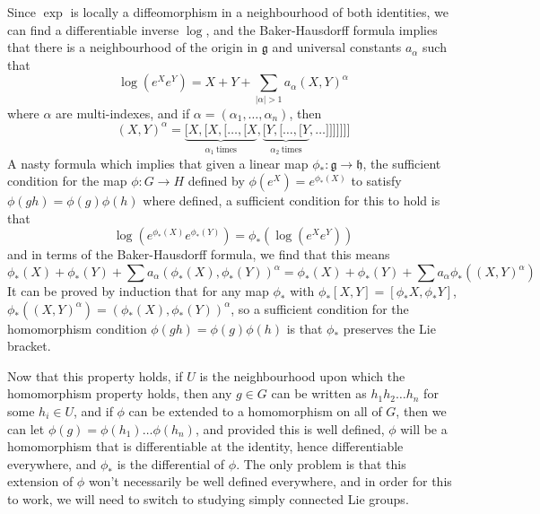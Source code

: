 Since $\exp$ is locally a diffeomorphism in a neighbourhood of both identities, we can find a differentiable inverse $\log$, and the Baker-Hausdorff formula implies that there is a neighbourhood of the origin in $\mathfrak{g}$ and universal constants $a_\alpha$ such that
%
\[ \log(e^X e^Y) = X + Y + \sum_{|\alpha| > 1} a_\alpha (X,Y)^\alpha \]
%
where $\alpha$ are multi-indexes, and if $\alpha = (\alpha_1, \dots, \alpha_n)$, then
%
\[ (X,Y)^\alpha = \underbrace{[X, [X, [\dots, [X}_{\alpha_1\ \text{times}}, \underbrace{[Y, [\dots, [Y}_{\alpha_2\ \text{times}}, \dots]]]]]]] \]
%
A nasty formula which implies that given a linear map $\phi_*: \mathfrak{g} \to \mathfrak{h}$, the sufficient condition for the map $\phi: G \to H$ defined by $\phi(e^X) = e^{\phi_*(X)}$ to satisfy $\phi(gh) = \phi(g) \phi(h)$ where defined, a sufficient condition for this to hold is that
%
\[ \log(e^{\phi_*(X)} e^{\phi_*(Y)}) = \phi_*(\log(e^X e^Y)) \]
%
and in terms of the Baker-Hausdorff formula, we find that this means
%
\[ \phi_*(X) + \phi_*(Y) + \sum a_\alpha (\phi_*(X), \phi_*(Y))^\alpha = \phi_*(X) + \phi_*(Y) + \sum a_\alpha \phi_*((X,Y)^\alpha) \]
%
It can be proved by induction that for any map $\phi_*$ with $\phi_*[X,Y] = [\phi_*X, \phi_*Y]$, $\phi_*((X,Y)^\alpha) = (\phi_*(X), \phi_*(Y))^\alpha$, so a sufficient condition for the homomorphism condition $\phi(gh) = \phi(g)\phi(h)$ is that $\phi_*$ preserves the Lie bracket.

Now that this property holds, if $U$ is the neighbourhood upon which the homomorphism property holds, then any $g \in G$ can be written as $h_1 h_2 \dots h_n$ for some $h_i \in U$, and if $\phi$ can be extended to a homomorphism on all of $G$, then we can let $\phi(g) = \phi(h_1) \dots \phi(h_n)$, and provided this is well defined, $\phi$ will be a homomorphism that is differentiable at the identity, hence differentiable everywhere, and $\phi_*$ is the differential of $\phi$. The only problem is that this extension of $\phi$ won't necessarily be well defined everywhere, and in order for this to work, we will need to switch to studying simply connected Lie groups.

